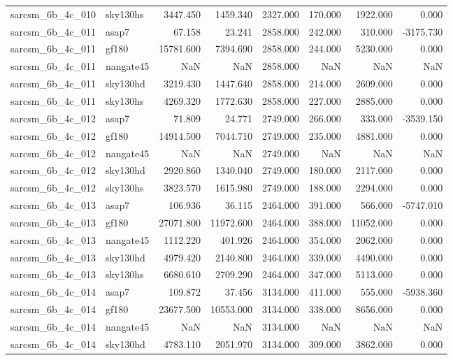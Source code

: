 \begin{tabular}{llrrrrrr}
sarcsm\_6b\_4c\_010 & sky130hs & 3447.450 & 1459.340 & 2327.000 & 170.000 & 1922.000 & 0.000 \\
sarcsm\_6b\_4c\_011 & asap7 & 67.158 & 23.241 & 2858.000 & 242.000 & 310.000 & -3175.730 \\
sarcsm\_6b\_4c\_011 & gf180 & 15781.600 & 7394.690 & 2858.000 & 244.000 & 5230.000 & 0.000 \\
sarcsm\_6b\_4c\_011 & nangate45 & NaN & NaN & 2858.000 & NaN & NaN & NaN \\
sarcsm\_6b\_4c\_011 & sky130hd & 3219.430 & 1447.640 & 2858.000 & 214.000 & 2609.000 & 0.000 \\
sarcsm\_6b\_4c\_011 & sky130hs & 4269.320 & 1772.630 & 2858.000 & 227.000 & 2885.000 & 0.000 \\
sarcsm\_6b\_4c\_012 & asap7 & 71.809 & 24.771 & 2749.000 & 266.000 & 333.000 & -3539.150 \\
sarcsm\_6b\_4c\_012 & gf180 & 14914.500 & 7044.710 & 2749.000 & 235.000 & 4881.000 & 0.000 \\
sarcsm\_6b\_4c\_012 & nangate45 & NaN & NaN & 2749.000 & NaN & NaN & NaN \\
sarcsm\_6b\_4c\_012 & sky130hd & 2920.860 & 1340.040 & 2749.000 & 180.000 & 2117.000 & 0.000 \\
sarcsm\_6b\_4c\_012 & sky130hs & 3823.570 & 1615.980 & 2749.000 & 188.000 & 2294.000 & 0.000 \\
sarcsm\_6b\_4c\_013 & asap7 & 106.936 & 36.115 & 2464.000 & 391.000 & 566.000 & -5747.010 \\
sarcsm\_6b\_4c\_013 & gf180 & 27071.800 & 11972.600 & 2464.000 & 388.000 & 11052.000 & 0.000 \\
sarcsm\_6b\_4c\_013 & nangate45 & 1112.220 & 401.926 & 2464.000 & 354.000 & 2062.000 & 0.000 \\
sarcsm\_6b\_4c\_013 & sky130hd & 4979.420 & 2140.800 & 2464.000 & 339.000 & 4490.000 & 0.000 \\
sarcsm\_6b\_4c\_013 & sky130hs & 6680.610 & 2709.290 & 2464.000 & 347.000 & 5113.000 & 0.000 \\
sarcsm\_6b\_4c\_014 & asap7 & 109.872 & 37.456 & 3134.000 & 411.000 & 555.000 & -5938.360 \\
sarcsm\_6b\_4c\_014 & gf180 & 23677.500 & 10553.000 & 3134.000 & 338.000 & 8656.000 & 0.000 \\
sarcsm\_6b\_4c\_014 & nangate45 & NaN & NaN & 3134.000 & NaN & NaN & NaN \\
sarcsm\_6b\_4c\_014 & sky130hd & 4783.110 & 2051.970 & 3134.000 & 309.000 & 3862.000 & 0.000 \\

\end{tabular}
